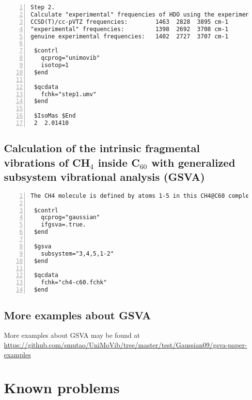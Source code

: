 \documentclass[12pt,english]{extarticle}
\begin{document}
\begin{Verbatim}[frame=single,label=example,labelposition=topline,numbers=left,rulecolor=\color{blue},fontsize=\footnotesize,baselinestretch=1.0]
Step 2.
Calculate "experimental" frequencies of HDO using the experimental frequencies of H2O.
CCSD(T)/cc-pVTZ frequencies:        1463  2828  3895 cm-1
"experimental" frequencies:         1398  2692  3708 cm-1
genuine experimental frequencies:   1402  2727  3707 cm-1

 $contrl
   qcprog="unimovib"
   isotop=1
 $end

 $qcdata
   fchk="step1.umv"
 $end

 $IsoMas $End
 2  2.01410
\end{Verbatim}

\clearpage
\subsection{Calculation of the intrinsic fragmental vibrations of CH$_4$ inside C$_{60}$ with generalized subsystem vibrational analysis (GSVA) } \label{sec:gsva-example}

\begin{Verbatim}[frame=single,label=example,labelposition=topline,numbers=left,rulecolor=\color{blue},fontsize=\footnotesize,baselinestretch=1.0]
The CH4 molecule is defined by atoms 1-5 in this CH4@C60 complex.

 $contrl
   qcprog="gaussian"
   ifgsva=.true.
 $end

 $gsva
   subsystem="3,4,5,1-2"
 $end

 $qcdata
   fchk="ch4-c60.fchk"
 $end
\end{Verbatim}

\subsection{More examples about GSVA} \label{sec:gsva-more}

More examples about GSVA may be found at \\ \href{https://github.com/smutao/UniMoVib/tree/master/test/Gaussian09/gsva-paper-examples} {https://github.com/smutao/UniMoVib/tree/master/test/Gaussian09/gsva-paper-examples}


\pagebreak{}


\section{Known problems} \label{part:problem}
\end{document}
